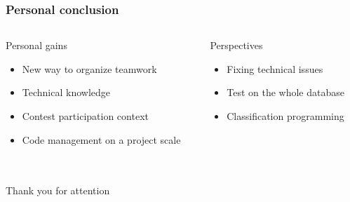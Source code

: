 \documentclass[xcolor=table]{beamer}
\begin{document}
\begin{frame}\frametitle{Personal conclusion}
\begin{columns}[t]
  \begin{column}{5cm}
    \begin{block}{Personal gains}
      \begin{itemize}
            \item New way to organize teamwork
            \item Technical knowledge
            \item Contest participation context
            \item Code management on a project scale
      \end{itemize}
    \end{block}
  \end{column}

  \begin{column}{5cm}
  \begin{block}{Perspectives}
  \begin{itemize}
        \item Fixing technical issues
        \item Test on the whole database
        \item Classification programming
  \end{itemize}
  \end{block}
  \end{column}
\end{columns}


\end{frame}


\section{}
\begin{frame}\frametitle{}
    \begin{center}
        \huge Thank you for attention
    \end{center}
\end{frame}
\end{document}
